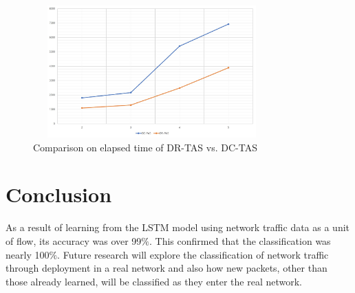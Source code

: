 \documentclass[10pt, twoside, jounal]{IEEEtran}
\begin{document}
\begin{figure}[!t]
\centering
\setlength{\abovecaptionskip}{0pt}
\setlength{\belowcaptionskip}{0pt}
{
\includegraphics[width=3.6in, height=2.0in]{fig6.jpg}
\caption{Comparison on elapsed time of DR-TAS vs. DC-TAS}
\label{fig6}
}
\end{figure}


\section{Conclusion}
As a result of learning from the LSTM model using network traffic data as a unit of flow, its accuracy was over 99$\%$. This confirmed that the classification was nearly 100$\%$.
Future research will explore the classification of network traffic through deployment in a real network and also how new packets, other than those already learned, will be classified as they enter the real network.

\ifCLASSOPTIONcaptionsoff
  \newpage
\fi


\end{document}
